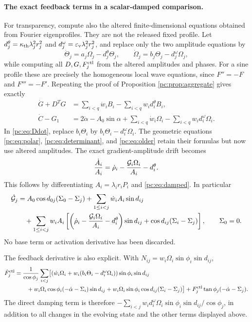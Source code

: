 \paragraph{The exact feedback terms in a scalar-damped comparison.}
For transparency, compute also the altered finite-dimensional equations obtained from Fourier eigenprofiles. They are not the released fixed profile. Let $d_j^\theta=\kappa_{\mathrm{th}}\lambda_j^2r_j^2$ and $d_j^\omega=\varepsilon_{\mathrm v}\lambda_j^2r_j^2$, and replace only the two amplitude equations by
\begin{equation}\label{pc:eq:damped}
 \dot\Theta_j=a_j\Omega_j-d_j^\theta\Theta_j,\qquad
 \dot\Omega_j=b_j\Theta_j-d_j^\omega\Omega_j,
\end{equation}
while computing all $D,G,F_j^{\rm ctl}$ from the altered amplitudes and phases. For a sine profile these are precisely the homogeneous local wave equations, since $F''=-F$ and $F'''=-F'$. Repeating the proof of Proposition \ref{pc:prop:aggregate} gives exactly
\begin{align}
 \dot G+D^TG&=\sum_{i<q}\dot w_iB_i-\sum_{i<q}w_i d_i^\theta B_i,\label{pc:eq:damped-background}\\
 \dot C-G_1&=2\ddot\alpha-A_0\sin\alpha+\sum_{i<q}\dot w_i\Omega_i
 -\sum_{i<q}w_i d_i^\omega\Omega_i.\nonumber
\end{align}
In \eqref{pc:eq:Ddot}, replace $b_i\Theta_i$ by $b_i\Theta_i-d_i^\omega\Omega_i$. The geometric equations \eqref{pc:eq:polar}, \eqref{pc:eq:determinant}, and \eqref{pc:eq:older} retain their formulas but now use altered amplitudes. The exact gradient-amplitude drift becomes
\begin{equation}\label{pc:eq:Adrift}
 \frac{\dot A_i}{A_i}=\dot\rho_i-\frac{\mathcal G_i\Omega_i}{A_i}-d_i^\theta.
\end{equation}
This follows by differentiating $A_i=\lambda_ir_iP_i$ and \eqref{pc:eq:damped}. In particular
\begin{align*}
 \dot{\mathcal G}_j&=A_0\cos d_{0j}(\Sigma_0-\Sigma_j)
 +\sum_{1\le i<j}\dot w_iA_i\sin d_{ij}\\
 &\quad+\sum_{1\le i<j}w_iA_i
 \left[\left(\dot\rho_i-\frac{\mathcal G_i\Omega_i}{A_i}-d_i^\theta\right)\sin d_{ij}
 +\cos d_{ij}(\Sigma_i-\Sigma_j)\right],\qquad \Sigma_0=0.
\end{align*}
No base term or activation derivative has been discarded.

The feedback derivative is also explicit. With $N_{ij}=w_i\Omega_i\sin\phi_i\sin d_{ij}$,
\begin{align*}
 \dot F_j^{\rm ctl}&=\frac1{\cos\phi_j}\sum_{i<j}\bigl[
 (\dot w_i\Omega_i+w_i(b_i\Theta_i-d_i^\omega\Omega_i))\sin\phi_i\sin d_{ij}\\
 &\qquad+w_i\Omega_i\cos\phi_i(-\dot\alpha-\Sigma_i)\sin d_{ij}
 +w_i\Omega_i\sin\phi_i\cos d_{ij}(\Sigma_i-\Sigma_j)\bigr]
 +F_j^{\rm ctl}\tan\phi_j(-\dot\alpha-\Sigma_j).
\end{align*}
The direct damping term is therefore $-\sum_{i<j}w_id_i^\omega\Omega_i\sin\phi_i\sin d_{ij}/\cos\phi_j$, in addition to all changes in the evolving state and the other terms displayed above.

